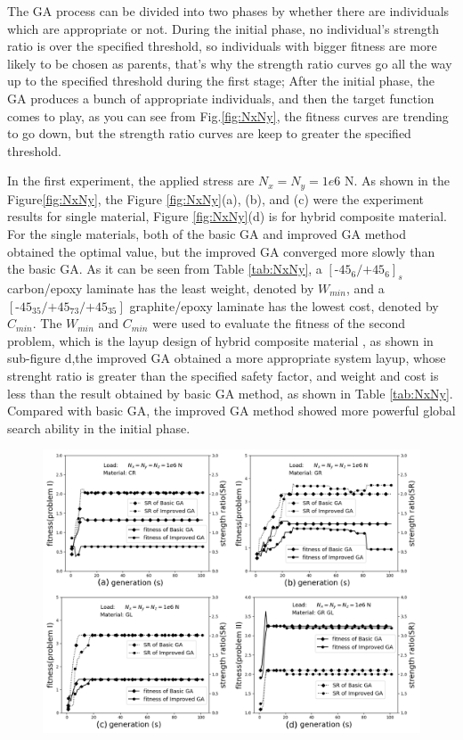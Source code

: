 \documentclass[Afour,sagev,times]{sagej}
\begin{document}
The GA process can be divided into two phases by whether there are individuals which are appropriate
or not. During the initial phase, no individual's strength ratio is over the specified threshold, so
individuals with bigger fitness are more likely to be chosen as parents, that's why the strength
ratio curves go all the way up to the specified threshold during the first stage; After the initial
phase, the GA produces a bunch of appropriate individuals, and then the target function comes to
play, as you can see from Fig.\ref{fig:NxNy}, the fitness curves are trending to go down, but the
strength ratio curves are keep to greater the specified threshold.


In the first experiment, the applied stress are $N_x=N_y=1e6$ N.  As shown in the
Figure\ref{fig:NxNy}, the Figure \ref{fig:NxNy}(a), (b), and (c) were the experiment results for single material,
Figure \ref{fig:NxNy}(d) is for hybrid composite material. For the single materials, both of the basic GA and improved
GA method obtained the optimal value, but the improved GA converged more slowly than the basic GA.
As it can be seen from Table \ref{tab:NxNy}, a $[\text{-}45_{6}/\text{+}45_{6}]_s$ carbon/epoxy
laminate has the least weight, denoted by $W_{min}$, and a
$[\text{-}45_{35}/\text{+}45_{73}/\text{+}45_{35}]$ graphite/epoxy laminate has the lowest cost,
denoted by $C_{min}$. The $W_{min}$ and $C_{min}$ were used to evaluate the fitness of the second
problem, which is the layup design of hybrid composite material , as shown in sub-figure d,the
improved GA obtained a more appropriate system layup, whose strenght ratio is greater than the
specified safety factor, and weight and cost is less than the result obtained by basic GA method, as
shown in Table \ref{tab:NxNy}. Compared with basic GA, the improved GA method showed more powerful
global search ability in the initial phase.

\begin{figure}
  \includegraphics[width=\linewidth]{A_laminate_design_images/NxNyNz.png}
  \label{fig:NxNyNz}
\end{figure}
\end{document}
